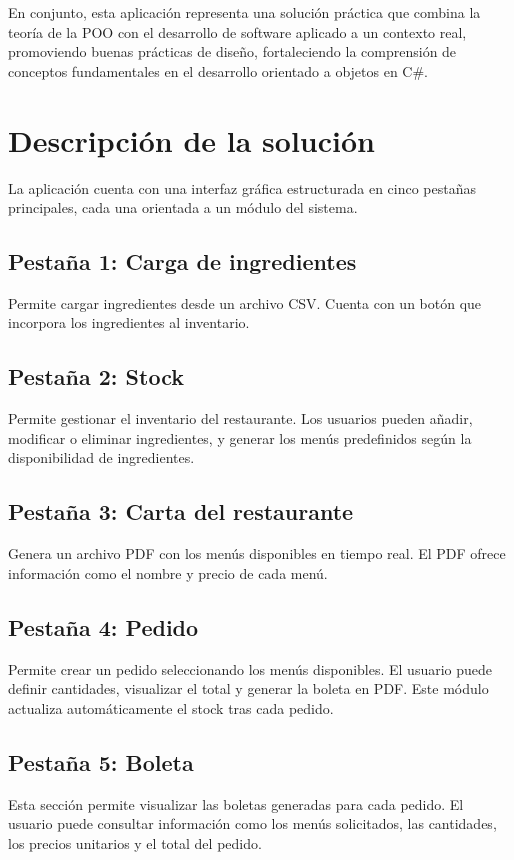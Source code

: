 \documentclass[12pt,a4paper]{article}
\begin{document}
\bigskip

En conjunto, esta aplicación representa una solución práctica que combina la teoría de la POO con el desarrollo de software aplicado a un contexto real, promoviendo buenas prácticas de diseño, fortaleciendo la comprensión de conceptos fundamentales en el desarrollo orientado a objetos en C\#.

\newpage

\section{Descripción de la solución}

La aplicación cuenta con una interfaz gráfica estructurada en cinco pestañas principales, cada una orientada a un módulo del sistema.

\subsection{Pestaña 1: Carga de ingredientes}
Permite cargar ingredientes desde un archivo CSV. Cuenta con un botón que incorpora los ingredientes al inventario.

\subsection{Pestaña 2: Stock}
Permite gestionar el inventario del restaurante. Los usuarios pueden añadir, modificar o eliminar ingredientes, y generar los menús predefinidos según la disponibilidad de ingredientes.

\subsection{Pestaña 3: Carta del restaurante}
Genera un archivo PDF con los menús disponibles en tiempo real. El PDF ofrece información como el nombre y precio de cada menú.

\subsection{Pestaña 4: Pedido}
Permite crear un pedido seleccionando los menús disponibles. El usuario puede definir cantidades, visualizar el total y generar la boleta en PDF. Este módulo actualiza automáticamente el stock tras cada pedido.

\subsection{Pestaña 5: Boleta}
Esta sección permite visualizar las boletas generadas para cada pedido. El usuario puede consultar información como los menús solicitados, las cantidades, los precios unitarios y el total del pedido. 
\end{document}
